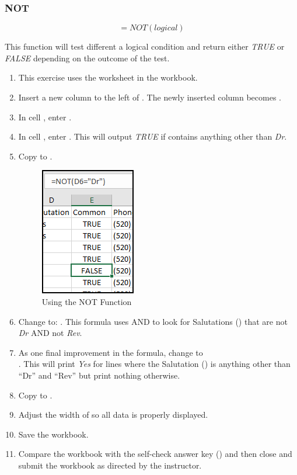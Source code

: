 \subsubsection{NOT}

\[ =NOT(logical) \]

This function will test different a logical condition and return either \textit{TRUE} or \textit{FALSE} depending on the outcome of the test.

\begin{enumerate}
	\item This exercise uses the  worksheet in the  workbook.
	\item Insert a new column to the left of . The newly inserted column becomes .
	\item In cell , enter .
	\item In cell , enter . This will output \textit{TRUE} if  contains anything other than \textit{Dr}. 
	\item Copy  to .
	
	\begin{figure}[H]
		\centering
		\includegraphics[width=\maxwidth{.50\linewidth}]{gfx/ch09_fig48}
		\caption{Using the NOT Function}
		\label{09:fig48}
	\end{figure}
	
	\item Change  to: . This formula uses AND to look for Salutations () that are not \textit{Dr} AND not \textit{Rev}.
	\item As one final improvement in the formula, change  to  \\. This will print \textit{Yes} for lines where the Salutation () is anything other than ``Dr'' and ``Rev'' but print nothing otherwise.	
	\item Copy  to .
	\item Adjust the width of  so all data is properly displayed.
	\item Save the  workbook.
	\item Compare the workbook with the self-check answer key () and then close and submit the  workbook as directed by the instructor.


\end{enumerate}
